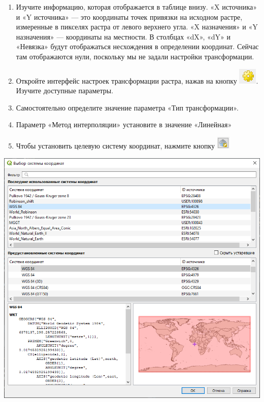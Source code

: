 \documentclass[
  12pt,
]{book}
\begin{document}
\begin{enumerate}
\def\labelenumi{\arabic{enumi}.}
\setcounter{enumi}{9}
\item
  Изучите информацию, которая отображается в таблице внизу. «X источника» и «Y источника» --- это координаты точек привязки на исходном растре, измеренные в пикселях растра от левого верхнего угла. «X назначения» и «Y назначения» --- координаты на местности. В столбцах «dX», «dY» и «Невязка» будут отображаться несхождения в определении координат. Сейчас там отображаются нули, поскольку мы не задали настройки трансформации.
\item
  Откройте интерфейс настроек трансформации растра, нажав на кнопку \includegraphics{images/Ex05_Reference/parametersButton.png}. Изучите доступные параметры.
\item
  Самостоятельно определите значение параметра «Тип трансформации».
\item
  Параметр «Метод интерполяции» установите в значение «Линейная»
\item
  Чтобы установить целевую систему координат, нажмите кнопку \includegraphics{images/Ex05_Reference/crsButton.png}
\end{enumerate}

\includegraphics{images/Ex05_Reference/CoordinateSystem.png}
\end{document}
